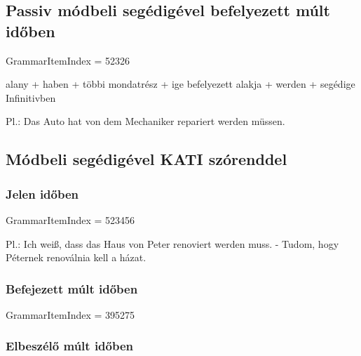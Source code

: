 \documentclass{article}
\newenvironment{desc}{\verbatim}{\endverbatim}
\newenvironment{exmp}{\verbatim}{\endverbatim}
\begin{document}
\begin{exmp}
\end{exmp}

\subsection{Passiv módbeli segédigével befelyezett múlt időben}

GrammarItemIndex = 52326

\begin{desc}
alany + haben + többi mondatrész + ige befelyezett alakja + werden + segédige Infinitivben

Pl.: Das Auto hat von dem Mechaniker repariert werden müssen.
\end{desc}

\begin{exmp}
\end{exmp}

\subsection{Módbeli segédigével KATI szórenddel}

\subsubsection{Jelen időben}

GrammarItemIndex = 523456

\begin{desc}
Pl.: Ich weiß, dass das Haus von Peter renoviert werden muss. - Tudom, hogy Péternek renoválnia kell a házat.
\end{desc}

\begin{exmp}
\end{exmp}

\subsubsection{Befejezett múlt időben}

GrammarItemIndex = 395275

\begin{desc}
\end{desc}

\begin{exmp}
\end{exmp}

\subsubsection{Elbeszélő múlt időben}
\end{document}
